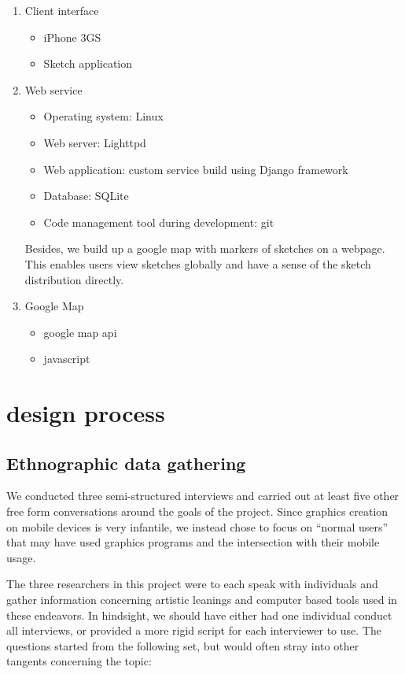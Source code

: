 \documentclass{chi2009}
\begin{document}
\begin{enumerate}
\item Client interface
        \begin{itemize}
        \item iPhone 3GS
        \item  Sketch application
        \end{itemize}

\item Web service
        \begin{itemize}
        \item Operating system: Linux
        \item Web server: Lighttpd
        \item Web application: custom service build using Django framework
        \item Database: SQLite
        \item Code management tool during development: git
        \end{itemize}


Besides, we build up a google map with markers of sketches on a webpage. This enables users view  sketches globally and have a sense of the sketch distribution directly.

\item Google Map
   \begin{itemize}
   \item google map api
   \item javascript
   \end{itemize}
   \end{enumerate}

\section{design process}

\subsection{Ethnographic data gathering}
We conducted three semi-structured interviews and carried out at least five
other free form conversations around the goals of the project.  Since graphics
creation on mobile devices is very infantile, we instead chose to focus on
``normal users'' that may have used graphics programs and the intersection with
their mobile usage.

The three researchers in this project were to each speak with individuals and
gather information concerning artistic leanings and computer based tools used
in these endeavors.  In hindsight, we should have either had one individual
conduct all interviews, or provided a more rigid script for each interviewer to
use.  The questions started from the following set, but would often stray into
other tangents concerning the topic:
\end{document}
